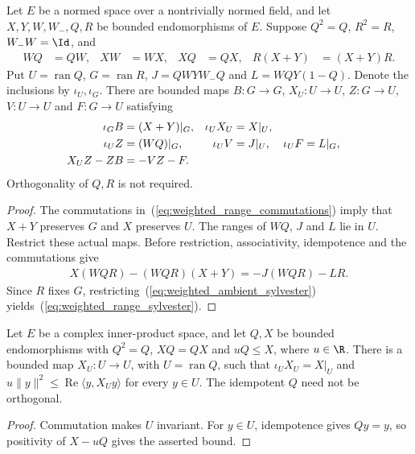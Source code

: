 \begin{theorem}
    \label{thm:weighted_restricted_sylvester}
    \leanok
    Let $E$ be a normed space over a nontrivially normed field, and let
    $X,Y,W,W_-,Q,R$ be bounded endomorphisms of $E$. Suppose $Q^2=Q$,
    $R^2=R$, $W_-W=\Id$, and
    \begin{align}
        WQ & =QW, & XW & =WX, & XQ & =QX, & R(X+Y) & =(X+Y)R.
        \label{eq:weighted_range_commutations}
    \end{align}
    Put $U=\operatorname{ran}Q$, $G=\operatorname{ran}R$,
    $J=QWYW_-Q$ and $L=WQY(1-Q)$. Denote the inclusions by $\iota_U,\iota_G$.
    There are bounded maps $B:G\to G$, $X_U:U\to U$, $Z:G\to U$,
    $V:U\to U$ and $F:G\to U$ satisfying
    \begin{align}
        \iota_G B & =(X+Y)|_G, & \iota_U X_U & =X|_U,\notag                            \\
        \iota_U Z & =(WQ)|_G,  & \iota_U V   & =J|_U,       & \iota_U F & =L|_G,\notag \\
        X_UZ-ZB   & =-VZ-F.
        \label{eq:weighted_range_sylvester}
    \end{align}
    Orthogonality of $Q,R$ is not required.
\end{theorem}
\begin{proof}
    \leanok
    The commutations in~(\ref{eq:weighted_range_commutations}) imply that
    $X+Y$ preserves $G$ and $X$ preserves $U$. The ranges of $WQ$, $J$
    and $L$ lie in $U$. Restrict these actual maps. Before restriction,
    associativity, idempotence and the commutations give
    \begin{align}
        X(WQR)-(WQR)(X+Y)=-J(WQR)-LR.
        \label{eq:weighted_ambient_sylvester}
    \end{align}
    Since $R$ fixes $G$, restricting~(\ref{eq:weighted_ambient_sylvester})
    yields~(\ref{eq:weighted_range_sylvester}).
\end{proof}

\begin{theorem}
    \label{thm:projection_range_quadratic_lower}
    \leanok
    Let $E$ be a complex inner-product space, and let $Q,X$ be bounded
    endomorphisms with $Q^2=Q$, $XQ=QX$ and $uQ\le X$, where $u\in\R$.
    There is a bounded map $X_U:U\to U$, with $U=\operatorname{ran}Q$,
    such that $\iota_U X_U=X|_U$ and
    $u\|y\|^2\le\operatorname{Re}\langle y,X_Uy\rangle$ for every $y\in U$.
    The idempotent $Q$ need not be orthogonal.
\end{theorem}
\begin{proof}
    \leanok
    Commutation makes $U$ invariant. For $y\in U$, idempotence gives
    $Qy=y$, so positivity of $X-uQ$ gives the asserted bound.
\end{proof}

